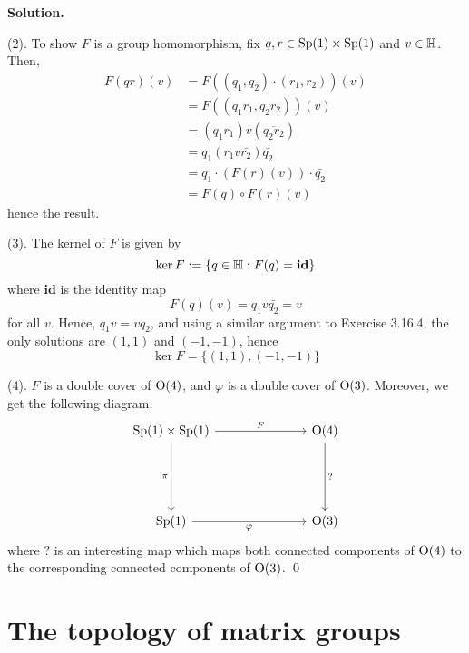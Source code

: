 \documentclass[12pt]{book}
\theoremstyle{definition}
\newenvironment{solution}
{%
  \par\noindent\textbf{Solution.}\quad
}
{%
  \qed\par
}
\begin{document}
\begin{solution}
  (2). To show $F$ is a group homomorphism, fix $q, r \in \mathrm{Sp}(1) \times \mathrm{Sp}(1)$ and $v \in \mathbb{H}$.
  Then, 
  \[
  \begin{aligned}
    F(qr)(v) &= F((q_1, q_2) \cdot (r_1, r_2))(v) \\
             &= F((q_1r_1, q_2r_2))(v) \\
             &= (q_1r_1)v(\overline{q_2r_2}) \\
             &= q_1(r_1v\bar{r_2})\bar{q_2} \\
             &= q_1 \cdot (F(r)(v)) \cdot\bar{q_2} \\
             &= F(q) \circ F(r) (v)
  \end{aligned}
  \]
  hence the result. 

  (3). The kernel of $F$ is given by
  \[
  \ker{F} := \{q \in \mathbb{H} : F(q) = \textbf{id}\}
  \]
  where $\textbf{id}$ is the identity map 
  \[
  F(q)(v) = q_1v\bar{q_2} = v
  \]
  for all $v$. 
  Hence, $q_1v = vq_2$, and using a similar argument to Exercise 3.16.4, the only solutions are $(1,1)$ and $(-1, -1)$, hence
  \[\ker{F} = \{(1,1), (-1,-1)\}\]

  (4). $F$ is a double cover of $\mathrm{O}(4)$, and $\varphi$ is a double cover of $\mathrm{O}(3)$.
  Moreover, we get the following diagram:
  \[\begin{tikzcd}
    {\Sp{1} \times \Sp{1}} &&& \Ogroup{4} \\
    \\
    \\
    {\Sp{1}} &&& {\Ogroup{3}}
    \arrow["{F}", from=1-1, to=1-4]
    \arrow["\pi"', from=1-1, to=4-1]
    \arrow["{\varphi}"', from=4-1, to=4-4]
    \arrow["?", from=1-4, to=4-4]
  \end{tikzcd}\]
  where $?$ is an interesting map which maps both connected components of $\mathrm{O}(4)$ to the corresponding connected components of $\mathrm{O}(3)$.
\end{solution}

\begin{taggedexercise}[\textcolor{red}{TODO}]

\end{taggedexercise}




\chapter{The topology of matrix groups}
\end{document}

